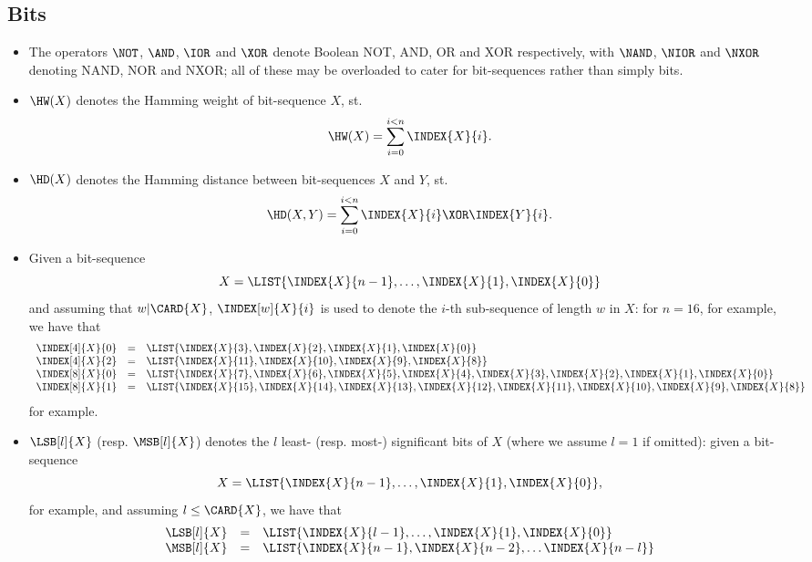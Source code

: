 
\subsection{Bits}

\begin{itemize}

\item The operators $\NOT$, $\AND$, $\IOR$ and $\XOR$ denote Boolean NOT, AND,
      OR and XOR respectively, with $\NAND$, $\NIOR$ and $\NXOR$ denoting NAND,
      NOR and NXOR; all of these may be overloaded to cater for bit-sequences
      rather than simply bits.
\item $\HW( X )$
      denotes the Hamming weight   of      bit-sequence  $X$,         st.
      \[
      \HW( X )    = \sum_{i=0}^{i<n} \INDEX{X}{i}                   .
      \]
\item $\HD( X )$
      denotes the Hamming distance between bit-sequences $X$ and $Y$, st.
      \[
      \HD( X, Y ) = \sum_{i=0}^{i<n} \INDEX{X}{i} \XOR \INDEX{Y}{i} .
      \]
\item Given a bit-sequence
      \[
      X = \LIST{ \INDEX{X}{n-1}, \ldots, \INDEX{X}{1}, \INDEX{X}{0} } 
      \]
      and assuming that $w | \CARD{X}$, $\INDEX[w]{X}{i}$ is used to denote the 
      $i$-th sub-sequence of length $w$ in $X$: for $n = 16$, for example, we
      have that
      \[
      \begin{array}{lcl}
      \INDEX[4]{X}{0} &=& \LIST{ \INDEX{X}{ 3}, \INDEX{X}{ 2}, \INDEX{X}{ 1}, \INDEX{X}{ 0}                                                             } \\
      \INDEX[4]{X}{2} &=& \LIST{ \INDEX{X}{11}, \INDEX{X}{10}, \INDEX{X}{ 9}, \INDEX{X}{ 8}                                                             } \\
      \INDEX[8]{X}{0} &=& \LIST{ \INDEX{X}{ 7}, \INDEX{X}{ 6}, \INDEX{X}{ 5}, \INDEX{X}{ 4}, \INDEX{X}{ 3}, \INDEX{X}{ 2}, \INDEX{X}{ 1}, \INDEX{X}{ 0} } \\
      \INDEX[8]{X}{1} &=& \LIST{ \INDEX{X}{15}, \INDEX{X}{14}, \INDEX{X}{13}, \INDEX{X}{12}, \INDEX{X}{11}, \INDEX{X}{10}, \INDEX{X}{ 9}, \INDEX{X}{ 8} } \\
      \end{array}
      \]
      for example.
\item $\LSB[l]{X}$ (resp. $\MSB[l]{X}$) denotes the $l$ least- (resp. most-)
      significant bits of $X$ (where we assume $l = 1$ if omitted): given a
      bit-sequence
      \[
      X = \LIST{ \INDEX{X}{n-1}, \ldots, \INDEX{X}{1}, \INDEX{X}{0} } ,
      \]
      for example, and assuming $l \leq \CARD{X}$, we have that
      \[
      \begin{array}{lcl}
      \LSB[l]{X} &=& \LIST{ \INDEX{X}{l-1},                 \ldots, \INDEX{X}{  1}, \INDEX{X}{  0} } \\
      \MSB[l]{X} &=& \LIST{ \INDEX{X}{n-1}, \INDEX{X}{n-2}, \ldots                  \INDEX{X}{n-l} } \\
      \end{array}
      \]

\end{itemize}

